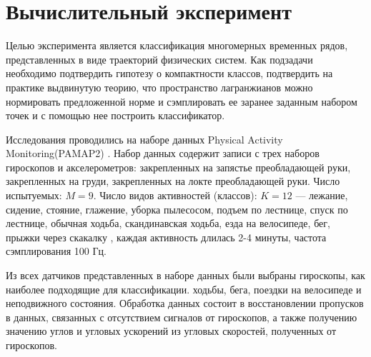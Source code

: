 \documentclass[12pt, twoside]{article}
\begin{document}
\section{Вычислительный эксперимент}
 Целью эксперимента является классификация многомерных временных рядов, представленных в виде траекторий физических систем. Как подзадачи необходимо подтвердить гипотезу о компактности классов, подтвердить на практике выдвинутую теорию, что пространство лагранжианов можно нормировать предложенной норме и сэмплировать ее заранее заданным набором точек и с помощью нее построить классификатор.

    Исследования проводились на наборе данных Physical Activity Monitoring(PAMAP2) \cite{dataset}.
    Набор данных содержит записи с трех наборов гироскопов и акселерометров: закрепленных на запястье преобладающей руки, закрепленных на груди, закрепленных на локте преобладающей руки. Число испытуемых: $M = 9$. Число видов активностей (классов): $K = 12$ — лежание, сидение, стояние, глажение, уборка пылесосом, подъем по лестнице, спуск по лестнице, обычная ходьба, скандинавская ходьба, езда на велосипеде, бег, прыжки через скакалку \cite{dataset}, каждая активность длилась 2-4 минуты, частота сэмплирования 100 Гц.


 Из всех датчиков представленных в наборе данных были выбраны гироскопы, как наиболее подходящие для классификации. ходьбы, бега, поездки на велосипеде и неподвижного состояния. Обработка данных состоит в восстановлении пропусков в данных, связанных с отсутствием сигналов от гироскопов, а также получению значению углов и угловых ускорений из угловых скоростей, полученных от гироскопов.
 
\end{document}
